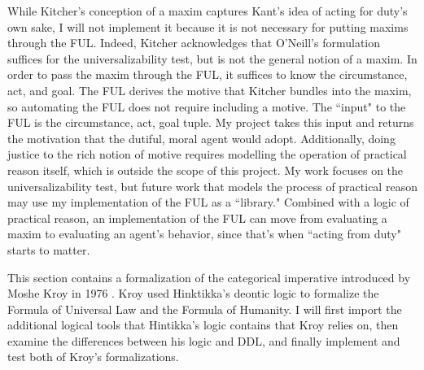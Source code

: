 \begin{isabellebody}
\begin{isamarkuptext}
While Kitcher's conception of a maxim captures Kant's idea of acting for duty's own sake, I will not implement it 
because it is not necessary for putting maxims through the FUL. Indeed, Kitcher acknowledges that 
O'Neill's formulation suffices for the universalizability test, but is not the general notion of a maxim.
In order to pass the maxim through the FUL, it suffices to know the circumstance, act, and goal. The FUL
derives the motive that Kitcher bundles into the maxim, so automating the FUL does not require 
including a motive. The ``input" to the FUL is the circumstance, act, goal tuple. My project takes 
this input and returns the motivation that the dutiful, moral agent would adopt. Additionally, doing
justice to the rich notion of motive requires modelling the operation of practical reason itself, 
which is outside the scope of this project. My work focuses on the universalizability test, but future work that 
models the process of practical reason may use my implementation of the FUL as a ``library." Combined 
with a logic of practical reason, an implementation of the FUL can move from evaluating a maxim to 
evaluating an agent's behavior, since that's when ``acting from duty" starts to matter.%
\end{isamarkuptext}\isamarkuptrue%
%
\isadelimdocument
%
\endisadelimdocument
%
\isatagdocument
%
\endisatagdocument
{\isafolddocument}%
%
\isadelimdocument
%
\endisadelimdocument
%
\isadelimproof
%
\endisadelimproof
%
\isatagproof
%
\endisatagproof
{\isafoldproof}%
%
\isadelimproof
%
\endisadelimproof
%
\isadelimdocument
%
\endisadelimdocument
%
\isatagdocument
%
\isamarkuptrue%
%
\endisatagdocument
{\isafolddocument}%
%
\isadelimdocument
%
\endisadelimdocument
%
\begin{isamarkuptext}%
This section contains a formalization of the categorical imperative introduced by Moshe Kroy in 
1976 \citep{kroy}. Kroy used Hinktikka's deontic logic to formalize the Formula of Universal Law and
the Formula of Humanity. I will first import the additional logical tools that Hintikka's logic contains 
that Kroy relies on, then examine the differences between his logic and DDL, and finally implement 
and test both of Kroy's formalizations.%
\end{isamarkuptext}\isamarkuptrue%
%
\isadelimdocument
%
\endisadelimdocument
%
\isatagdocument
%
\isamarkuptrue%
%
\endisatagdocument
{\isafolddocument}%
%
\isadelimdocument

\end{isabellebody}
